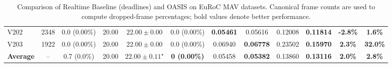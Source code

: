 \begin{table}[htbp]
{\begin{tabular}{l|c|cc|cc|cc|cc|cc}
V202 & 2348 & 0.0 (0.00\%) & 20.00 & $22.00 \pm 0.00$ & 0.0 (0.00\%) & \textbf{0.05461} & 0.05616 & 0.12008 & \textbf{0.11814} & \textbf{-2.8\%} & \textbf{1.6\%} \\
V203 & 1922 & 0.0 (0.00\%) & 20.00 & $22.00 \pm 0.00$ & 0.0 (0.00\%) & 0.06940 & \textbf{0.06778} & 0.23502 & \textbf{0.15970} & \textbf{2.3\%} & \textbf{32.0\%} \\
\hline
\textbf{Average} & -- & 0.7 (0.0\%) & 20.00 & $22.00 \pm 0.11$" & \textbf{0 (0.00\%)} & 0.05458 & \textbf{0.05382} & 0.13860 & \textbf{0.13116} & \textbf{2.0\%} & \textbf{2.8\%} \\
\hline
\hline
\end{tabular}}
\caption{Comparison of Realtime Baseline (deadlines) and OASIS on EuRoC MAV datasets. Canonical frame counts are used to compute dropped-frame percentages; bold values denote better performance.}
\label{tab:super_table_results}
\end{table}
